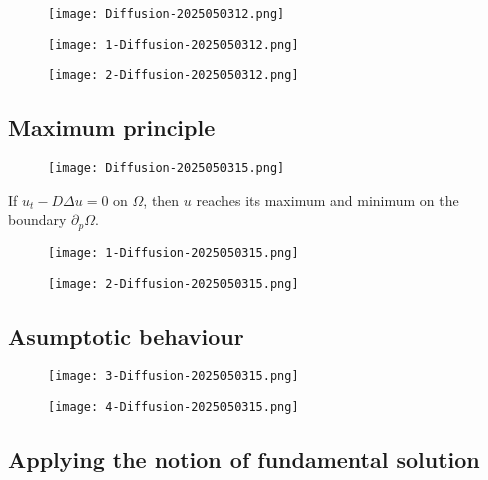 \begin{figure}[H]
\centering
\texttt{[image: Diffusion-2025050312.png]}
\label{}
\end{figure}
\begin{figure}[H]
\centering
\texttt{[image: 1-Diffusion-2025050312.png]}
\label{}
\end{figure}
\begin{figure}[H]
\centering
\texttt{[image: 2-Diffusion-2025050312.png]}
\label{}
\end{figure}

\subsection{Maximum principle}

\begin{figure}[H]
\centering
\texttt{[image: Diffusion-2025050315.png]}
\label{}
\end{figure}

If $u_{t}-D\Delta u=0$ on $\Omega$, then $u$ reaches its maximum and minimum on the boundary $\partial_{p}\Omega$.

\begin{figure}[H]
\centering
\texttt{[image: 1-Diffusion-2025050315.png]}
\label{}
\end{figure}
\begin{figure}[H]
\centering
\texttt{[image: 2-Diffusion-2025050315.png]}
\label{}
\end{figure}

\subsection{Asumptotic behaviour}

\begin{figure}[H]
\centering
\texttt{[image: 3-Diffusion-2025050315.png]}
\label{}
\end{figure}
\begin{figure}[H]
\centering
\texttt{[image: 4-Diffusion-2025050315.png]}
\label{}
\end{figure}

\subsection{Applying the notion of fundamental solution}


